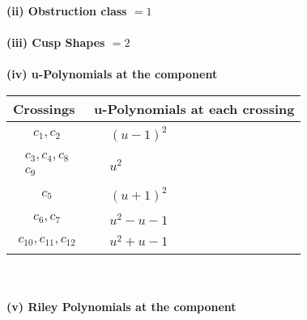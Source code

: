 \documentclass[1p]{elsarticle_modified}
\theoremstyle{definition}
\begin{document}
\flushleft \textbf{(ii) Obstruction class $= 1$}\\~\\
\flushleft \textbf{(iii) Cusp Shapes $= 2$}\\~\\
\newpage\renewcommand{\arraystretch}{1}
\flushleft \textbf{(iv) u-Polynomials at the component}\newline \\
\begin{tabular}{m{50pt}|m{274pt}}
Crossings & \hspace{64pt}u-Polynomials at each crossing \\
\hline $$\begin{aligned}c_{1},c_{2}\end{aligned}$$&$\begin{aligned}
&(u-1)^2
\end{aligned}$\\
\hline $$\begin{aligned}c_{3},c_{4},c_{8}\\c_{9}\end{aligned}$$&$\begin{aligned}
&u^2
\end{aligned}$\\
\hline $$\begin{aligned}c_{5}\end{aligned}$$&$\begin{aligned}
&(u+1)^2
\end{aligned}$\\
\hline $$\begin{aligned}c_{6},c_{7}\end{aligned}$$&$\begin{aligned}
&u^2- u-1
\end{aligned}$\\
\hline $$\begin{aligned}c_{10},c_{11},c_{12}\end{aligned}$$&$\begin{aligned}
&u^2+u-1
\end{aligned}$\\
\hline
\end{tabular}\\~\\
\newpage\renewcommand{\arraystretch}{1}
\flushleft \textbf{(v) Riley Polynomials at the component}\newline \\
\end{document}
